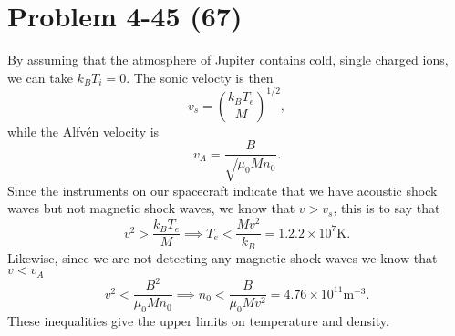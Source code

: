 \section*{Problem 4-45 (67)}
\label{sec:4-45}
By assuming that the atmosphere of Jupiter contains cold, single charged ions, we can take \(k_BT_i = 0 \). The sonic velocty is then
\begin{equation*}
	v_s = \left(\dfrac{k_BT_e}{M} \right)^{1/2},
\end{equation*}
while the Alfv\'en velocity is 
\begin{equation*}
	v_A = \dfrac{B}{\sqrt{\mu_0Mn_0}}.
\end{equation*}
Since the instruments on our spacecraft indicate that we have acoustic shock waves but not magnetic shock waves, we know that
\(v > v_s \), this is to say that
\begin{equation*}
	v^2 > \dfrac{k_BT_e}{M} \implies T_e < \dfrac{Mv^2}{k_B} = 1.2.2\times 10^7\text{K}.
\end{equation*}
Likewise, since we are not detecting any magnetic shock waves we know that \(v < v_A \)
\begin{equation*}
	v^2 < \dfrac{B^2}{\mu_0Mn_0} \implies n_0 < \dfrac{B}{\mu_0Mv^2} = 4.76\times 10^{11}\text{m}^{-3}.
\end{equation*}
These inequalities give the upper limits on temperature and density.

